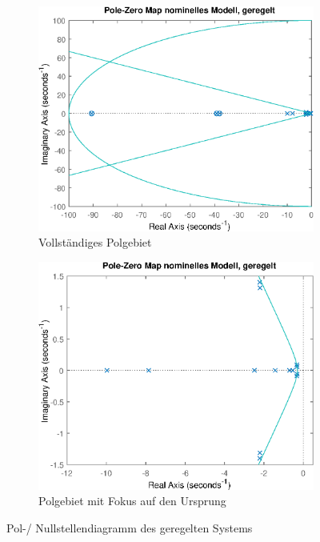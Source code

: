 \begin{figure}[h] %
	\centering
	\begin{subfigure}{.49\textwidth}
		\centering
		\includegraphics[width=\linewidth]{./Bilder/pzmap_controlled.eps}
		\caption{Vollständiges Polgebiet}
		\label{fig:pzmap_controlled_ohnezoom}
	\end{subfigure}
	\hfill
	\begin{subfigure}{.49\textwidth}
		\centering
		\includegraphics[width=\linewidth]{./Bilder/pzmap_controlled_zoom.eps}
		\caption{Polgebiet mit Fokus auf den Ursprung}
		\label{fig:pzmap_controlled_zoom}
	\end{subfigure}
	\caption{Pol-/ Nullstellendiagramm des geregelten Systems}
	\label{fig:pzmap_controlled}
\end{figure}

